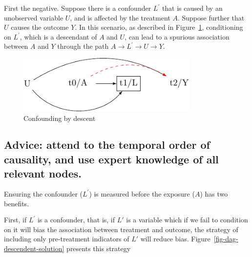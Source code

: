 \documentclass[
  singlecolumn]{report}
\begin{document}
First the negative. Suppose there is a confounder \(L^\prime\) that is
caused by an unobserved variable \(U\), and is affected by the treatment
\(A\). Suppose further that \(U\) causes the outcome \(Y\). In this
scenario, as described in Figure~\ref{fig-dag-descendent}, conditioning
on \(L^\prime\), which is a descendant of \(A\) and \(U\), can lead to a
spurious association between \(A\) and \(Y\) through the path
\(A \to L^\prime \to U \to Y\).

\begin{figure}

{\centering \includegraphics[width=0.8\textwidth,height=\textheight]{causal-dags_files/figure-pdf/fig-dag-descendent-1.pdf}

}

\caption{\label{fig-dag-descendent}Confounding by descent}

\end{figure}

\hypertarget{advice-attend-to-the-temporal-order-of-causality-and-use-expert-knowledge-of-all-relevant-nodes.}{%
\subsection{Advice: attend to the temporal order of causality, and use
expert knowledge of all relevant
nodes.}\label{advice-attend-to-the-temporal-order-of-causality-and-use-expert-knowledge-of-all-relevant-nodes.}}

Ensuring the confounder (\(L^\prime\)) is measured before the exposure
(\(A\)) has two benefits.

First, if \(L^\prime\) is a confounder, that is, if \(L\prime\) is a
variable which if we fail to condition on it will bias the association
between treatment and outcome, the strategy of including only
pre-treatment indicators of \(L\prime\) will reduce bias.
Figure~\ref{fig-dag-descendent-solution} presents this strategy
\end{document}
